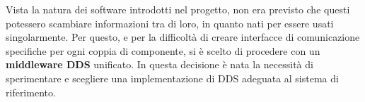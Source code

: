 Vista la natura dei software introdotti nel progetto, non era previsto che questi potessero scambiare informazioni tra di loro, in quanto nati per essere usati singolarmente. Per questo, e per la difficoltà di creare interfacce di comunicazione specifiche per ogni coppia di componente, si è scelto di procedere con un \textbf{middleware DDS} unificato. In questa decisione è nata la necessità di sperimentare e scegliere una implementazione di DDS adeguata al sistema di riferimento. %